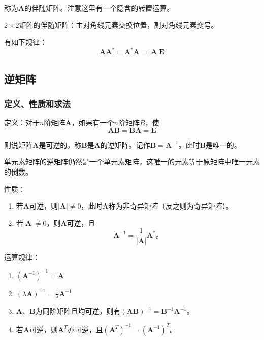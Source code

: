 \documentclass[12pt, a4paper, oneside]{ctexart}
\begin{document}
称为$\mathbf{A}$的伴随矩阵。注意这里有一个隐含的转置运算。

$2\times 2$矩阵的伴随矩阵：主对角线元素交换位置，副对角线元素变号。

有如下规律：
\begin{equation*}
  \mathbf{AA}^{*}=\mathbf{A}^{*}\mathbf{A}=|\mathbf{A}|\mathbf{E}
\end{equation*}

\subsection{逆矩阵}

\subsubsection{定义、性质和求法}

定义：对于$n$阶矩阵$\mathbf{A}$，如果有一个$n$阶矩阵$B$，使
\begin{equation*}
  \mathbf{AB}=\mathbf{BA}=\mathbf{E}
\end{equation*}

则说矩阵$\mathbf{A}$是可逆的，称$\mathbf{B}$是$\mathbf{A}$的逆矩阵。记作$\mathbf{B}=\mathbf{A}^{-1}$。此时$\mathbf{B}$是唯一的。

单元素矩阵的逆矩阵仍然是一个单元素矩阵，这唯一的元素等于原矩阵中唯一元素的倒数。

性质：
\begin{enumerate}
  \item 若$\mathbf{A}$可逆，则$|\mathbf{A}|\neq 0$，此时$\mathbf{A}$称为非奇异矩阵（反之则为奇异矩阵）。
  \item 若$|\mathbf{A}|\neq 0$，则$\mathbf{A}$可逆，且
  \begin{equation*}
    \mathbf{A}^{-1}=\frac{1}{|\mathbf{A}|}\mathbf{A}^{*}。
  \end{equation*}
\end{enumerate}

运算规律：
\begin{enumerate}
  \item $(\mathbf{A}^{-1})^{-1}=\mathbf{A}$
  \item $(\lambda \mathbf{A})^{-1}=\frac{1}{\lambda}\mathbf{A}^{-1}$
  \item $\mathbf{A}$、$\mathbf{B}$为同阶矩阵且均可逆，则有$(\mathbf{AB})^{-1}=\mathbf{B}^{-1}\mathbf{A}^{-1}$。
  \item 若$\mathbf{A}$可逆，则$\mathbf{A}^T$亦可逆，且$(\mathbf{A}^T)^{-1}=(\mathbf{A}^{-1})^T$。
\end{enumerate}
\end{document}
